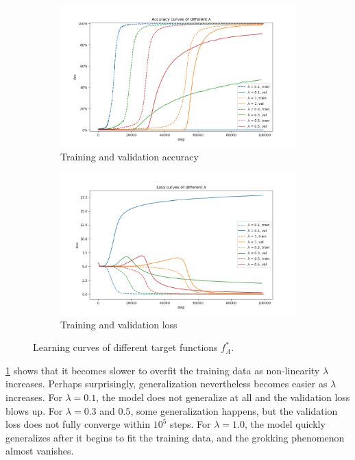 \begin{figure}[!ht]
    \centering
    \begin{subfigure}{0.45\textwidth}
        \centering
        \includegraphics[width=\linewidth]{fig/grokking_curves/different_Afraction_acc.png}
        \caption{Training and validation accuracy}
        \label{fig:different_lambda_acc}
    \end{subfigure}
    \begin{subfigure}{0.45\textwidth}
        \centering
        \includegraphics[width=\linewidth]{fig/loss_curves/different_Afraction_loss.png}
        \caption{Training and validation loss}
        \label{fig:different_lambda_loss}
    \end{subfigure}

    \caption{Learning curves of different target functions $f_A^*$.}
    \label{fig:acc_and_loss_different_lambda}
\end{figure}

\cref{fig:different_lambda_acc} shows that it becomes slower to overfit the training data as non-linearity $\lambda$ increases.
Perhaps surprisingly, generalization nevertheless becomes easier as $\lambda$ increases.
For $\lambda = 0.1$, the model does not generalize at all and the validation loss blows up.
For $\lambda = 0.3$ and $0.5$, some generalization happens, but the validation loss does not fully converge within $10^5$ steps.
For $\lambda = 1.0$, the model quickly generalizes after it begins to fit the training data, and the grokking phenomenon almost vanishes.

